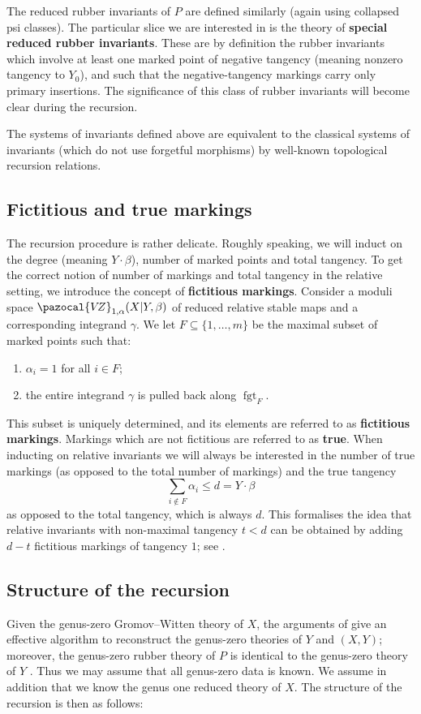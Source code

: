 \documentclass[11pt]{amsart}
\newcommand{\VZ}{\pazocal{V\!Z}}
\newcommand{\fgt}{\operatorname{fgt}}
\theoremstyle{definition}
\theoremstyle{definition}
\begin{document}
The reduced rubber invariants of $P$ are defined similarly (again using collapsed psi classes). The particular slice we are interested in is the theory of \textbf{special reduced rubber invariants}. These are by definition the rubber invariants which involve at least one marked point of negative tangency (meaning nonzero tangency to $Y_0$), and such that the negative-tangency markings carry only primary insertions. The significance of this class of rubber invariants will become clear during the recursion. 

The systems of invariants defined above are equivalent to the classical systems of invariants (which do not use forgetful morphisms) by well-known topological recursion relations.

\subsection{Fictitious and true markings} The recursion procedure is rather delicate. Roughly speaking, we will induct on the degree (meaning $Y\cdot\beta$), number of marked points and total tangency. To get the correct notion of number of markings and total tangency in  the relative setting, we introduce the concept of \textbf{fictitious markings}. Consider a moduli space $\VZ_{1,\alpha}(X|Y,\beta)$ of reduced relative stable maps and a corresponding integrand $\gamma$. We let $F \subseteq \{1,\ldots,m\}$ be the maximal subset of marked points such that:
\begin{enumerate}
\item $\alpha_i = 1$ for all $i \in F$;
\item the entire integrand $\gamma$ is pulled back along $\fgt_F$.
\end{enumerate}
This subset is uniquely determined, and its elements are referred to as \textbf{fictitious markings}. Markings which are not fictitious are referred to as \textbf{true}. When inducting on relative invariants we will always be interested in the number of true markings (as opposed to the total number of markings) and the true tangency
\begin{equation*} \sum_{i \not\in F} \alpha_i \leq d=Y\cdot \beta \end{equation*}
as opposed to the total tangency, which is always $d$. This formalises the idea that relative invariants with non-maximal tangency $t<d$ can be obtained by adding $d-t$ fictitious markings of tangency $1$; see \cite[Lemma 1.15(i)]{Ga}.

\subsection{Structure of the recursion} Given the genus-zero Gromov--Witten theory of $X$, the arguments of \cite{Ga} give an effective algorithm to reconstruct the genus-zero theories of $Y$ and $(X,Y)$; moreover, the genus-zero rubber theory of $P$ is identical to the genus-zero theory of $Y$ \cite{GathmannThesis}. Thus we may assume that all genus-zero data is known. We assume in addition that we know the genus one reduced theory of $X$. The structure of the recursion is then as follows:
\end{document}
